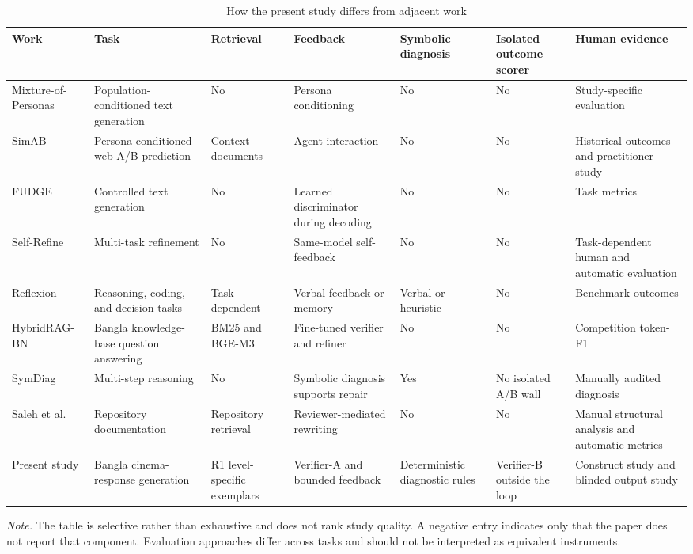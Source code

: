 \begin{table}[H]
\centering
\caption{How the present study differs from adjacent work}
\label{tab:related-work-comparison}
\scriptsize
\setlength{\tabcolsep}{2pt}
\renewcommand{\arraystretch}{1.08}
\begin{tabularx}{\textwidth}{@{}
  >{\raggedright\arraybackslash}p{}
  >{\raggedright\arraybackslash}p{}
  >{\raggedright\arraybackslash}p{}
  >{\raggedright\arraybackslash}p{}
  >{\raggedright\arraybackslash}p{}
  >{\raggedright\arraybackslash}p{}
  >{\raggedright\arraybackslash}p{}@{}}
\toprule
\textbf{Work} & \textbf{Task} & \textbf{Retrieval} & \textbf{Feedback} & \textbf{Symbolic diagnosis} & \textbf{Isolated outcome scorer} & \textbf{Human evidence} \\
\midrule
Mixture-of-Personas \cite{b9} & Population-conditioned text generation & No & Persona conditioning & No & No & Study-specific evaluation \\
SimAB \cite{b10} & Persona-conditioned web A/B prediction & Context documents & Agent interaction & No & No & Historical outcomes and practitioner study \\
FUDGE \cite{b11} & Controlled text generation & No & Learned discriminator during decoding & No & No & Task metrics \\
Self-Refine \cite{b13} & Multi-task refinement & No & Same-model self-feedback & No & No & Task-dependent human and automatic evaluation \\
Reflexion \cite{b14} & Reasoning, coding, and decision tasks & Task-dependent & Verbal feedback or memory & Verbal or heuristic & No & Benchmark outcomes \\
HybridRAG-BN \cite{b19} & Bangla knowledge-base question answering & BM25 and BGE-M3 & Fine-tuned verifier and refiner & No & No & Competition token-F1 \\
SymDiag \cite{b20} & Multi-step reasoning & No & Symbolic diagnosis supports repair & Yes & No isolated A/B wall & Manually audited diagnosis \\
Saleh et al. \cite{b21} & Repository documentation & Repository retrieval & Reviewer-mediated rewriting & No & No & Manual structural analysis and automatic metrics \\
Present study & Bangla cinema-response generation & R1 level-specific exemplars & Verifier-A and bounded feedback & Deterministic diagnostic rules & Verifier-B outside the loop & Construct study and blinded output study \\
\bottomrule
\end{tabularx}

\vspace{0.5em}
\parbox{\textwidth}{\footnotesize\emph{Note.} The table is selective rather than exhaustive and does not rank study quality. A negative entry indicates only that the paper does not report that component. Evaluation approaches differ across tasks and should not be interpreted as equivalent instruments.}
\end{table}

